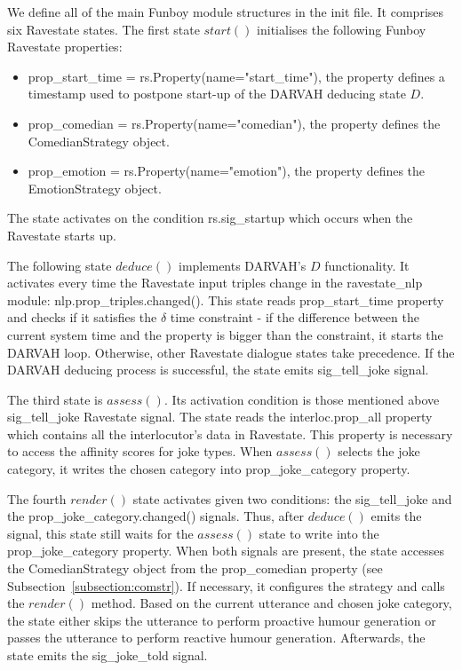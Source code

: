 We define all of the main Funboy module structures in the init file. It comprises six Ravestate states. The first state \( start()\) initialises the following Funboy Ravestate properties:
\begin{itemize}
    \item prop\_start\_time = rs.Property(name="start\_time"), the property defines a timestamp used to postpone start-up of the DARVAH deducing state \( D\).
    \item prop\_comedian = rs.Property(name="comedian"), the property defines the ComedianStrategy object.
    \item prop\_emotion = rs.Property(name="emotion"), the property defines the EmotionStrategy object.
\end{itemize}
The state activates on the condition rs.sig\_startup which occurs when the Ravestate starts up. 

The following state \( deduce()\) implements DARVAH's \( D\) functionality. It activates every time the Ravestate input triples change in the ravestate\_nlp module: nlp.prop\_triples.changed(). This state reads prop\_start\_time property and checks if it satisfies the \(\delta\) time constraint - if the difference between the current system time and the property is bigger than the constraint, it starts the DARVAH loop. Otherwise, other Ravestate dialogue states take precedence. If the DARVAH deducing process is successful, the state emits sig\_tell\_joke signal.

The third state is \(assess()\). Its activation condition is those mentioned above sig\_tell\_joke Ravestate signal. The state reads the interloc.prop\_all property which contains all the interlocutor's data in Ravestate. This property is necessary to access the affinity scores for joke types. When \(assess()\) selects the joke category, it writes the chosen category into prop\_joke\_category property.

The fourth \(render()\) state activates given two conditions: the sig\_tell\_joke and the prop\_joke\_category.changed() signals. Thus, after \(deduce()\) emits the signal, this state still waits for the \(assess()\) state to write into the prop\_joke\_category property. When both signals are present, the state accesses the ComedianStrategy object from the prop\_comedian property (see Subsection~\ref{subsection:comstr}). If necessary, it configures the strategy and calls the \(render()\) method. Based on the current utterance and chosen joke category, the state either skips the utterance to perform proactive humour generation or passes the utterance to perform reactive humour generation. Afterwards, the state emits the sig\_joke\_told signal.

